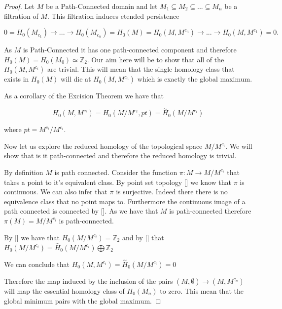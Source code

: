 \begin{proof}
    Let $M$ be a Path-Connected domain and let $M_1 \subseteq M_2 \subseteq ... \subseteq M_n$ be a filtration of $M$. This filtration induces etended persistence 

$$ 0 = H_0(M_{c_1}) \rightarrow ... \rightarrow H_0(M_{c_n}) = H_0(M) = H_0(M, M^{c_n}) \rightarrow ... \rightarrow H_0(M, M^{c_{1}}) = 0.$$

As $M$ is Path-Connected it has one path-connected component and therefore $H_0(M) = H_0(M_0) \simeq  \mathbb{Z}_2$.  Our aim here will be to show that all of the $H_0(M, M^{c_i})$ are trivial. This will mean that the single homology class that exists in $H_0(M)$ will die at $H_0(M, M^{c_n})$ which is exactly the global maximum.


As a corollary of the Excision Theorem we have that

$$H_0(M, M^{c_i}) = H_0(M / M^{c_i}, pt) = \overset{\sim}{H}_0(M / M^{c_i})$$  

where $pt = M^{c_i} / M^{c_i}$.

Now let us explore the reduced homology of the topological space $M / M^{c_i}$. We will show that is it path-connected and therefore the reduced homology is trivial.


By definition $M$ is path connected. Consider the function $\pi: M \to M/ M^{c_i}$ that takes a point to it's equivalent class. By point set topology [] we know that $\pi$ is continuous. We can also infer that $\pi$ is surjective. Indeed there there is no equivalence class that no point maps to. Furthermore the continuous image of a path connected is connected by []. As we have that $M$ is path-connected therefore $\pi(M) = M / M^{c_i}$ is path-connected. 

By [] we have that $H_0(M / M^{c_i}) = \mathbb{Z}_2$ and by [] that $H_0(M / M^{c_i}) = \overset{\sim}{H}_0(M / M^{c_i}) \bigoplus \mathbb{Z}_2$

We can conclude that $H_0(M, M^{c_i}) = \overset{\sim}{H}_0(M / M^{c_i}) = 0$

Therefore the map induced by the inclusion of the pairs $(M, \emptyset) \to (M, M^{c_n})$ will map the essential homology class of $H_0(M_n)$ to zero. This mean that the global minimum pairs with the global maximum.

\end{proof}

